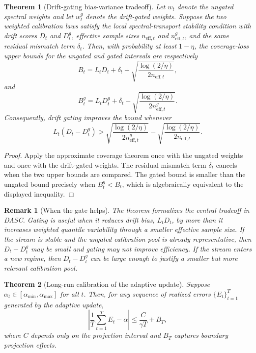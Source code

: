 \documentclass[11pt]{article}
\newtheorem{theorem}{Theorem}
\newtheorem{remark}{Remark}
\begin{document}
\begin{theorem}[Drift-gating bias-variance tradeoff]
Let $w_t$ denote the ungated spectral weights and let $w_t^g$ denote the drift-gated weights. Suppose the two weighted calibration laws satisfy the local spectral-transport stability condition with drift scores $D_t$ and $D_t^g$, effective sample sizes $n_{\mathrm{eff},t}$ and $n_{\mathrm{eff},t}^g$, and the same residual mismatch term $\delta_t$. Then, with probability at least $1-\eta$, the coverage-loss upper bounds for the ungated and gated intervals are respectively
\[
    B_t
    =
    L_tD_t+\delta_t+
    \sqrt{\frac{\log(2/\eta)}{2n_{\mathrm{eff},t}}},
\]
and
\[
    B_t^g
    =
    L_tD_t^g+\delta_t+
    \sqrt{\frac{\log(2/\eta)}{2n_{\mathrm{eff},t}^g}}.
\]
Consequently, drift gating improves the bound whenever
\[
    L_t(D_t-D_t^g)
    >
    \sqrt{\frac{\log(2/\eta)}{2n_{\mathrm{eff},t}^g}}
    -
    \sqrt{\frac{\log(2/\eta)}{2n_{\mathrm{eff},t}}}.
\]
\end{theorem}

\begin{proof}
Apply the approximate coverage theorem once with the ungated weights and once with the drift-gated weights. The residual mismatch term $\delta_t$ cancels when the two upper bounds are compared. The gated bound is smaller than the ungated bound precisely when $B_t^g<B_t$, which is algebraically equivalent to the displayed inequality.
\end{proof}

\begin{remark}[When the gate helps]
The theorem formalizes the central tradeoff in DASC. Gating is useful when it reduces drift bias, $L_tD_t$, by more than it increases weighted quantile variability through a smaller effective sample size. If the stream is stable and the ungated calibration pool is already representative, then $D_t-D_t^g$ may be small and gating may not improve efficiency. If the stream enters a new regime, then $D_t-D_t^g$ can be large enough to justify a smaller but more relevant calibration pool.
\end{remark}

\begin{theorem}[Long-run calibration of the adaptive update]
Suppose $\alpha_t\in[\alpha_{\min},\alpha_{\max}]$ for all $t$. Then, for any sequence of realized errors $\{E_t\}_{t=1}^T$ generated by the adaptive update,
\[
    \left|
    \frac{1}{T}\sum_{t=1}^T E_t - \alpha
    \right|
    \leq
    \frac{C}{\gamma T} + B_T,
\]
where $C$ depends only on the projection interval and $B_T$ captures boundary projection effects.
\end{theorem}
\end{document}
